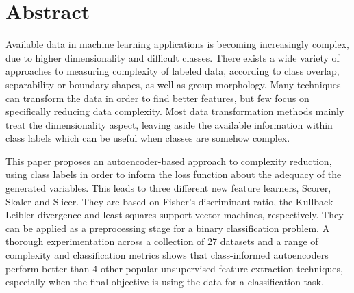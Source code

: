\documentclass[
	fontsize=11pt, %
	twoside=false, %
	open=any, %
	secnumdepth=1, %
]{kaobook}
\newcommand{\change}[1]{{\color{blue}#1}}
\renewcommand{\change}[1]{#1}
\newcommand{\rechange}[1]{{\color{blue}#1}}
\renewcommand{\rechange}[1]{#1}
\begin{document}
  \section*{Abstract}
    Available data in machine learning applications is becoming increasingly complex, due to higher dimensionality and difficult classes. There exists a wide variety of approaches to measuring complexity of labeled data, according to class overlap, separability or boundary shapes, as well as \rechange{group morphology}. Many techniques can transform the data in order to find better features, but few focus on specifically reducing data complexity. Most \rechange{data transformation} methods mainly treat the dimensionality aspect, leaving aside the available information \rechange{within} class labels which can be useful when classes are somehow complex.

    This paper proposes \change{an} autoencoder-based approach to complexity reduction, using class labels in order to inform the loss function about the adequacy of the generated variables. \change{This leads to three different new feature learners}, Scorer, Skaler and Slicer. They are based on Fisher's discriminant ratio, the Kullback-Leibler divergence and least-squares support vector machines, respectively. \rechange{They can be applied as a preprocessing stage for a binary classification problem.} A thorough experimentation across a collection of 27 datasets and a range of complexity and classification metrics shows that class-informed autoencoders perform better than 4 other popular unsupervised feature extraction techniques, especially when the final objective is using the data for a classification task.





\end{document}
